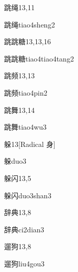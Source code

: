 \begin{entry}{跳绳}{13,11}
  \begin{phonetics}{跳绳}{tiao4sheng2}
  \end{phonetics}
\end{entry}

\begin{entry}{跳跳糖}{13,13,16}
  \begin{phonetics}{跳跳糖}{tiao4tiao4tang2}
  \end{phonetics}
\end{entry}

\begin{entry}{跳频}{13,13}
  \begin{phonetics}{跳频}{tiao4pin2}
  \end{phonetics}
\end{entry}

\begin{entry}{跳舞}{13,14}
  \begin{phonetics}{跳舞}{tiao4wu3}
  \end{phonetics}
\end{entry}

\begin{entry}{躲}{13}[Radical ⾝]
  \begin{phonetics}{躲}{duo3}
  \end{phonetics}
\end{entry}

\begin{entry}{躲闪}{13,5}
  \begin{phonetics}{躲闪}{duo3shan3}
  \end{phonetics}
\end{entry}

\begin{entry}{辞典}{13,8}
  \begin{phonetics}{辞典}{ci2dian3}
  \end{phonetics}
\end{entry}

\begin{entry}{遛狗}{13,8}
  \begin{phonetics}{遛狗}{liu4gou3}
  \end{phonetics}
\end{entry}

